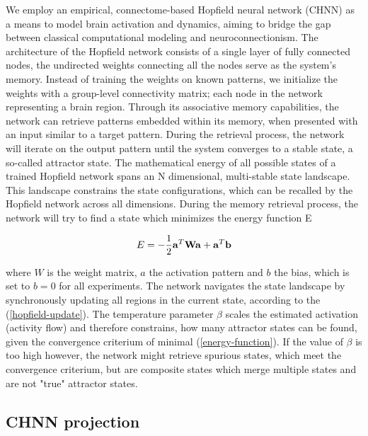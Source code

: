 \documentclass{article}
\begin{document}
We employ an empirical, connectome-based Hopfield neural network (CHNN) as a means to model brain activation and dynamics, aiming to
bridge the gap between classical computational modeling and neuroconnectionism. The architecture of the Hopfield network
\citep{hopfield1982neural} consists of a single layer of fully connected nodes, the undirected weights connecting
all the nodes serve as the system's memory.
Instead of training the weights on known patterns, we initialize the weights with a group-level
connectivity matrix; each node in the network representing a brain region. Through its associative memory capabilities,
the network can retrieve patterns embedded within its memory, when presented with an input similar to a target
pattern. During the retrieval process, the network will iterate on the output pattern until the system converges to a
stable state, a so-called attractor state. The mathematical energy of all possible states of a trained Hopfield network
spans an N dimensional, multi-stable state landscape. This landscape constrains the state configurations, which can be
recalled by the Hopfield network across all dimensions. During the memory retrieval process, the network will try to
find a state which minimizes the energy function E

\begin{equation}
\label{energy-function}
E = - \frac{1}{2}  \bold{a}^{T} \bold{W} \bold{a} + \bold{a}^{T}\bold{b}
\end{equation}

where $W$ is the weight matrix, $a$ the activation pattern and $b$ the bias, which is set to $b = 0$ for all experiments.
The network navigates the state landscape by synchronously updating all regions in the current state, according to the
(\ref{hopfield-update}). The temperature parameter $\beta$ scales the estimated activation (activity flow)
\citep{cole2016activity}and therefore constrains, how many attractor states can be found, given the convergence
criterium of minimal (\ref{energy-function}).
If the value of $\beta$ is too high however, the network might retrieve spurious states,
which meet the convergence criterium, but are composite states which merge multiple states and are not "true"
attractor states.

\subsection{CHNN projection}\label{CHNN projection}
\end{document}
